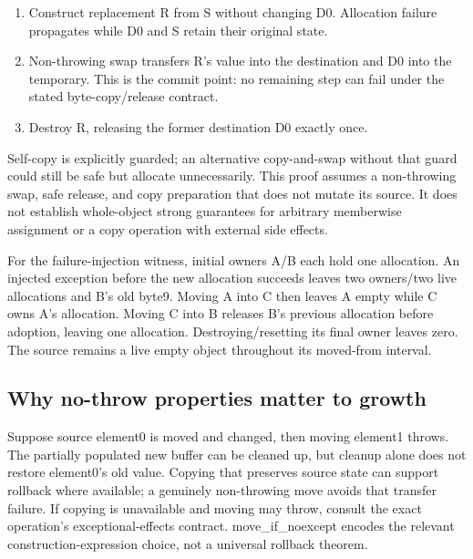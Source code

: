 \begin{enumerate}
\def\labelenumi{\arabic{enumi}.}
\tightlist
\item
  Construct replacement R from S without changing D0. Allocation failure propagates while D0 and S retain their original state.
\item
  Non-throwing swap transfers R's value into the destination and D0 into the temporary. This is the commit point: no remaining step can fail under the stated byte-copy/release contract.
\item
  Destroy R, releasing the former destination D0 exactly once.
\end{enumerate}

Self-copy is explicitly guarded; an alternative copy-and-swap without that guard could still be safe but allocate unnecessarily. This proof assumes a non-throwing swap, safe release, and copy preparation that does not mutate its source. It does not establish whole-object strong guarantees for arbitrary memberwise assignment or a copy operation with external side effects.

For the failure-injection witness, initial owners A/B each hold one allocation. An injected exception before the new allocation succeeds leaves two owners/two live allocations and B's old byte9. Moving A into C then leaves A empty while C owns A's allocation. Moving C into B releases B's previous allocation before adoption, leaving one allocation. Destroying/resetting its final owner leaves zero. The source remains a live empty object throughout its moved-from interval.

\subsection{Why no-throw properties matter to growth}\label{03-visual-computing-i-ch018-why-no-throw-properties-matter-to-growth}

\hypertarget{03-visual-computing-i-ch018-why-no-throw-properties-matter-to-growth}{}

Suppose source element0 is moved and changed, then moving element1 throws. The partially populated new buffer can be cleaned up, but cleanup alone does not restore element0's old value. Copying that preserves source state can support rollback where available; a genuinely non-throwing move avoids that transfer failure. If copying is unavailable and moving may throw, consult the exact operation's exceptional-effects contract. move\_if\_noexcept encodes the relevant construction-expression choice, not a universal rollback theorem.

